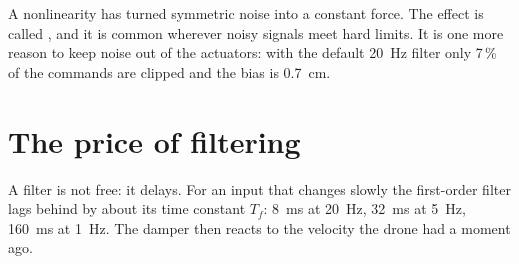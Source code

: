 A nonlinearity has turned symmetric noise into a constant force. The effect is called , and it is common wherever noisy signals meet hard limits. It is one more reason to keep noise out of the actuators: with the default \SI{20}{Hz} filter only 7\,\% of the commands are clipped and the bias is \SI{0.7}{cm}.

\section{The price of filtering}

A filter is not free: it delays. For an input that changes slowly the first-order filter lags behind by about its time constant $T_f$: \SI{8}{ms} at \SI{20}{Hz}, \SI{32}{ms} at \SI{5}{Hz}, \SI{160}{ms} at \SI{1}{Hz}. The damper then reacts to the velocity the drone had a moment ago.

